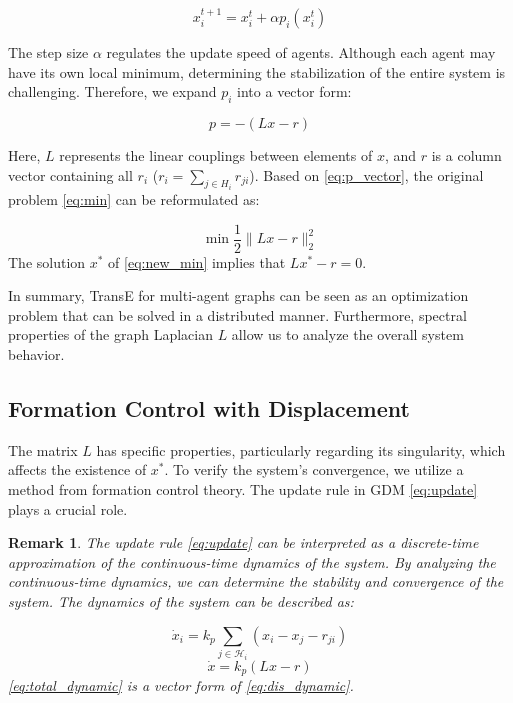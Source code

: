 \documentclass[letterpaper, 10 pt, conference]{ieeeconf}  %
\newtheorem{remark}{Remark}
\begin{document}
\begin{equation}
    x_{i}^{t+1} = x_i^t + \alpha p_i(x_i^t)
    \label{eq:update}
\end{equation}

The step size \( \alpha \) regulates the update speed of agents. Although each agent may have its own local minimum, determining the stabilization of the entire system is challenging. Therefore, we expand \( p_i \) into a vector form:

\begin{equation}
    p = - (Lx - r)
    \label{eq:p_vector}
\end{equation}

Here, \( L \) represents the linear couplings between elements of \( x \), and \( r \) is a column vector containing all \( r_i \) (\( r_i = \sum_{j \in H_i} r_{ji} \)). Based on \eqref{eq:p_vector}, the original problem \eqref{eq:min} can be reformulated as:

\begin{equation}
    \min \frac{1}{2} \|Lx - r\|_{2}^{2}
    \label{eq:new_min}
\end{equation}
\noindent The solution \( x^* \) of \eqref{eq:new_min} implies that \( Lx^* - r = 0 \). %

In summary, TransE for multi-agent graphs can be seen as an optimization problem that can be solved in a distributed manner. Furthermore, spectral properties of the graph Laplacian \( L \) allow us to analyze the overall system behavior.

\subsection{Formation Control with Displacement}

The matrix \( L \) has specific properties, particularly regarding its singularity, which affects the existence of \( x^* \). To verify the system’s convergence, we utilize a method from formation control theory. The update rule in GDM \eqref{eq:update} plays a crucial role. 

\begin{remark}
    The update rule \eqref{eq:update} can be interpreted as a discrete-time approximation of the continuous-time dynamics of the system. By analyzing the continuous-time dynamics, we can determine the stability and convergence of the system. The dynamics of the system can be described as:

    \begin{equation}\label{eq:dis_dynamic}
        \dot{x}_i = k_p \sum_{j \in \mathcal{H}_i} (x_{i} - x_{j} - r_{ji})
    \end{equation}
    \begin{equation}\label{eq:total_dynamic}
        \dot{x} = k_p(Lx - r)
    \end{equation}
    \noindent \eqref{eq:total_dynamic} is a vector form of \eqref{eq:dis_dynamic}.
\end{remark}
\end{document}
